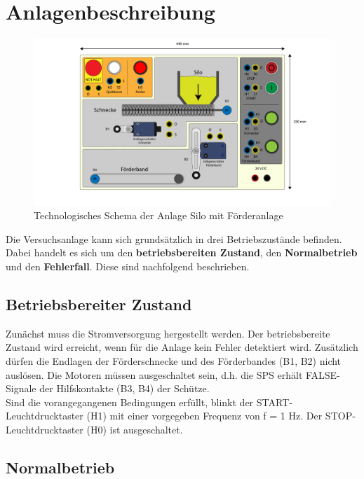 \section{Anlagenbeschreibung}

\begin{figure}[H]
   \centering
   \includegraphics[width=1.0\textwidth]{Bilder/Aufbauplan_Vorderseite.pdf}
   \caption[Technologieschema]{Technologisches Schema der Anlage \glqq Silo mit Förderanlage\grqq{}}
   \label{fig:Bild1}
\end{figure}

Die Versuchsanlage kann sich grundsätzlich in drei Betriebszustände befinden. Dabei handelt es sich um den \textbf{betriebsbereiten Zustand}, den \textbf{Normalbetrieb} und den \textbf{Fehlerfall}. Diese sind nachfolgend beschrieben.

\subsection{Betriebsbereiter Zustand}

Zunächst muss die Stromversorgung hergestellt werden. Der betriebsbereite Zustand wird erreicht, wenn für die Anlage kein Fehler detektiert wird. Zusätzlich dürfen die Endlagen der Förderschnecke und des Förderbandes (B1, B2) nicht auslösen. Die Motoren müssen ausgeschaltet sein, d.h. die SPS erhält FALSE-Signale der Hilfskontakte (B3, B4) der Schütze.\\
Sind die vorangegangenen Bedingungen erfüllt, blinkt der START-Leuchtdrucktaster (H1) mit einer vorgegeben Frequenz von f = 1 Hz. Der STOP-Leuchtdrucktaster (H0) ist ausgeschaltet.

\subsection{Normalbetrieb}

